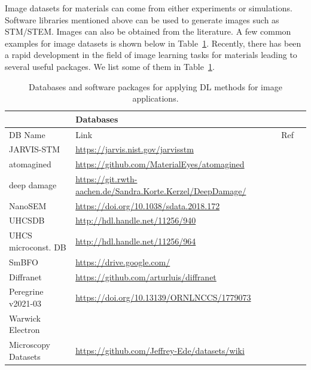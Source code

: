 \documentclass[pdflatex,sn-mathphys]{sn-jnl}%
\theoremstyle{thmstyleone}%
\theoremstyle{thmstyletwo}%
\theoremstyle{thmstylethree}%
\begin{document}
Image datasets for materials can come from either experiments or simulations. Software libraries mentioned above can be used to generate images such as STM/STEM. Images can also be obtained from the literature. A few common examples for image datasets is shown below in Table~\ref{tab:image-software}. Recently, there has been a rapid development in the field of image learning tasks for materials leading to several useful packages. We list some of them in Table~\ref{tab:image-software}.
\begin{table}[ht]
\begin{minipage}{174pt}
\caption{Databases and software packages for applying DL methods for image applications.}\label{tab:image-software}%
\begin{tabular}{@{}llll@{}}

\toprule
   & Databases  & \\
\midrule
DB Name   & Link  & Ref\\
\midrule
JARVIS-STM   &  \url{https://jarvis.nist.gov/jarvisstm}   & \cite{choudhary2021computational}  \\
atomagined   &  \url{https://github.com/MaterialEyes/atomagined}   & \cite{ophus2017fast}  \\ 
deep damage & \url{https://git.rwth-aachen.de/Sandra.Korte.Kerzel/DeepDamage/} & \cite{kusche2019large} \\
NanoSEM & \url{https://doi.org/10.1038/sdata.2018.172} & \cite{aversa2018first} \\ 
UHCSDB & \url{http://hdl.handle.net/11256/940} & \cite{decost_hecht_francis_webler_picard_holm_2017} \\
UHCS microconst. DB & \url{http://hdl.handle.net/11256/964} & \cite{decost_lei_francis_holm_2019} \\
SmBFO & \url{https://drive.google.com/} & \cite{ziatdinov2020causal} \\
Diffranet & \url{https://github.com/arturluis/diffranet} & \cite{deepfreak2019} \\
Peregrine v2021-03 & \url{https://doi.org/10.13139/ORNLNCCS/1779073} & \cite{osti_1779073} \\
Warwick Electron\\Microscopy Datasets & \url{https://github.com/Jeffrey-Ede/datasets/wiki} & \cite{Ede2020db} \\


\end{tabular}
\end{minipage}
\end{table}
\end{document}
